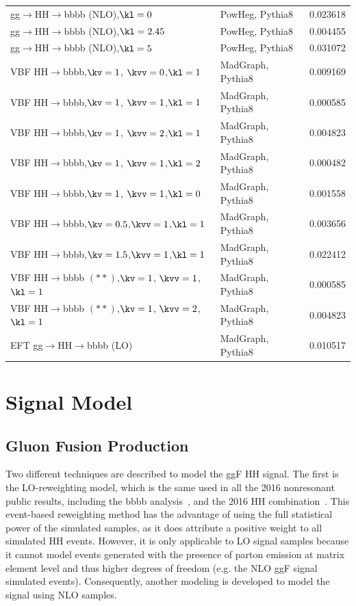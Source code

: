 \begin{table}[htb]
\begin{tabularx}{\textwidth}{lXr}
gg$\to$HH$\to$bbbb (NLO),$\kl=0$    & PowHeg, Pythia8      & 0.023618\\
gg$\to$HH$\to$bbbb (NLO),$\kl=2.45$ & PowHeg, Pythia8      & 0.004455\\
gg$\to$HH$\to$bbbb (NLO),$\kl=5$    & PowHeg, Pythia8      & 0.031072\\
VBF HH$\to$bbbb,$\kv = 1$,  $\kvv = 0$,$\kl = 1$ &MadGraph, Pythia8          & 0.009169\\
VBF HH$\to$bbbb,$\kv = 1$,  $\kvv = 1$,$\kl = 1$ &MadGraph, Pythia8          & 0.000585\\
VBF HH$\to$bbbb,$\kv = 1$,  $\kvv = 2$,$\kl = 1$ &MadGraph, Pythia8          & 0.004823\\
VBF HH$\to$bbbb,$\kv = 1$,  $\kvv = 1$,$\kl = 2$ &MadGraph, Pythia8          & 0.000482\\
VBF HH$\to$bbbb,$\kv = 1$,  $\kvv = 1$,$\kl = 0$ &MadGraph, Pythia8          & 0.001558\\
VBF HH$\to$bbbb,$\kv = 0.5$,$\kvv = 1$,$\kl = 1$ &MadGraph, Pythia8          & 0.003656\\
VBF HH$\to$bbbb,$\kv = 1.5$,$\kvv = 1$,$\kl = 1$ &MadGraph, Pythia8          & 0.022412\\
VBF HH$\to$bbbb $(**)$,$\kv = 1$,  $\kvv = 1$,$\kl = 1$ &MadGraph, Pythia8   & 0.000585\\
VBF HH$\to$bbbb $(**)$,$\kv = 1$,  $\kvv = 2$,$\kl = 1$ &MadGraph, Pythia8   & 0.004823\\
EFT gg$\to$HH$\to$bbbb (LO)         & MadGraph, Pythia8    & 0.010517\\
\hline
\end{tabularx}
\end{table}

\chapter{Signal Model} \label{appendix:hhsignalmodel}
\section{Gluon Fusion Production} \label{sec:ggfsignalmodel}

Two different techniques are described to model the ggF HH signal. The first is the LO-reweighting model, which is the same used in all the 2016 nonresonant public results, including the bbbb analysis~\cite{bbbbcmsnr}, and the 2016 HH combination~\cite{cmshhrun1comb}. This event-based reweighting method has the advantage of using the full statistical power of the simulated samples, as it does attribute a positive weight to all simulated HH events. However, it is only applicable to LO signal samples because it cannot model events generated with the presence of parton emission at matrix element level and thus higher degrees of freedom (e.g. the NLO ggF signal simulated events). Consequently, another modeling is developed to model the signal using NLO samples.

